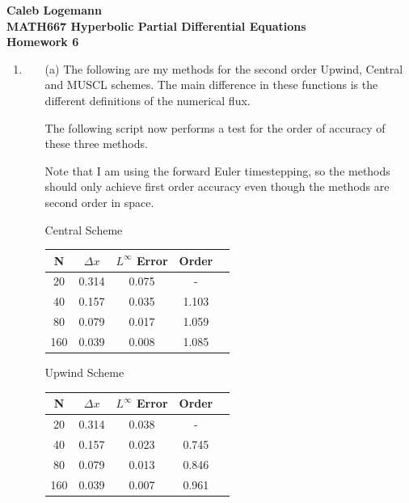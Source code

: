 \documentclass[11pt, oneside]{article}
\begin{document}
\noindent \textbf{\Large{Caleb Logemann \\
MATH667 Hyperbolic Partial Differential Equations \\
Homework 6
}}

%
\begin{enumerate}
  \item %
    \begin{enumerate}
      \item[(a)]
        The following are my methods for the second order Upwind, Central and
        MUSCL schemes.
        The main difference in these functions is the different definitions of
        the numerical flux.
        
        
        

        The following script now performs a test for the order of accuracy of
        these three methods.
        
        Note that I am using the forward Euler timestepping, so the methods
        should only achieve first order accuracy even though the methods are
        second order in space.

        \begin{center}
          Central Scheme \\
          \begin{tabular}{*{5}{c}}
            \toprule
            N & $\Delta x$ & $L^{\infty}$ Error & Order \\
            \midrule
            20 & 0.314 & 0.075 & - \\
            40 & 0.157 & 0.035 & 1.103 \\
            80 & 0.079 & 0.017 & 1.059 \\
            160 & 0.039 & 0.008 & 1.085 \\
            \bottomrule
          \end{tabular}
        \end{center}

        \begin{center}
          Upwind Scheme \\
          \begin{tabular}{*{5}{c}}
            \toprule
            N & $\Delta x$ & $L^{\infty}$ Error & Order \\
            \midrule
            20 & 0.314 & 0.038 & - \\
            40 & 0.157 & 0.023 & 0.745 \\
            80 & 0.079 & 0.013 & 0.846 \\
            160 & 0.039 & 0.007 & 0.961 \\
            \bottomrule
          \end{tabular}
        \end{center}


\end{enumerate}
\end{enumerate}
\end{document}
